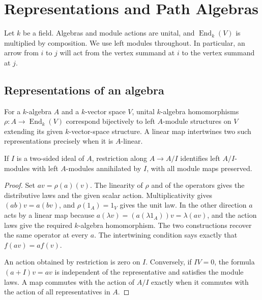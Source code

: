 \chapter{Representations and Path Algebras}
\label{ch:rm03-quivers}

Let \(k\) be a field. Algebras and module actions are unital, and
\(\operatorname{End}_k(V)\) is multiplied by composition. We use left
modules throughout. In particular, an arrow from \(i\) to \(j\) will
act from the vertex summand at \(i\) to the vertex summand at \(j\).

\section{Representations of an algebra}

\begin{proposition}
\label{prop:rm03-algebra-representations}
For a \(k\)-algebra \(A\) and a \(k\)-vector space \(V\), unital
\(k\)-algebra homomorphisms
\(\rho\colon A\to\operatorname{End}_k(V)\) correspond bijectively to
left \(A\)-module structures on \(V\) extending its given
\(k\)-vector-space structure. A linear map intertwines two such
representations precisely when it is \(A\)-linear.

If \(I\) is a two-sided ideal of \(A\), restriction along
\(A\to A/I\) identifies left \(A/I\)-modules with left \(A\)-modules
annihilated by \(I\), with all module maps preserved.
\end{proposition}

\begin{proof}
Set \(av=\rho(a)(v)\). The linearity of \(\rho\) and of the operators
gives the distributive laws and the given scalar action.
Multiplicativity gives \((ab)v=a(bv)\), and \(\rho(1_A)=1_V\) gives
the unit law. In the other direction \(a\) acts by a linear map
because \(a(\lambda v)=(a(\lambda 1_A))v=\lambda(av)\), and the
action laws give the required \(k\)-algebra homomorphism. The two
constructions recover the same operator at every \(a\). The
intertwining condition says exactly that \(f(av)=af(v)\).

An action obtained by restriction is zero on \(I\). Conversely, if
\(IV=0\), the formula \((a+I)v=av\) is independent of the
representative and satisfies the module laws. A map commutes with the
action of \(A/I\) exactly when it commutes with the action of all
representatives in \(A\).
\end{proof}

